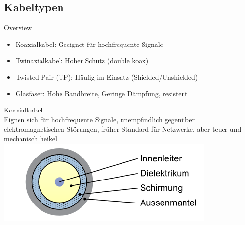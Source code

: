     \subsection{Kabeltypen}
    \begin{concept}{Overview}
        \begin{itemize}
            \item Koaxialkabel: Geeignet für hochfrequente Signale
            \item Twinaxialkabel: Hoher Schutz (double koax)
            \item Twisted Pair (TP): Häufig im Einsatz (Shielded/Unshielded)
            \item Glasfaser: Hohe Bandbreite, Geringe Dämpfung, resistent
        \end{itemize}        
    \end{concept}

    \begin{definition}{Koaxialkabel}\\
        Eignen sich für hochfrequente Signale, unempfindlich gegenüber elektromagnetischen Störungen, früher Standard für Netzwerke, aber teuer und mechanisch heikel\\
            \includegraphics[width=0.3\linewidth]{images/Koaxkabel.png}
    \end{definition}

